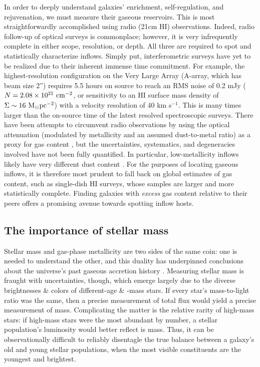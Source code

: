 In order to deeply understand galaxies' enrichment, self-regulation, and rejuvenation, we must measure their gaseous reservoirs. This is most straightforwardly accomplished using radio (21cm HI) observations. Indeed, radio follow-up of optical surveys is commonplace; however, it is very infrequently complete in either scope, resolution, or depth. All three are required to spot and statistically characterize inflows. Simply put, interferometric surveys have yet to be realized due to their inherent immense time commitment. For example, the highest-resolution configuration on the Very Large Array (A-array, which has beam size 2'') requires 5.5 hours on source to reach an RMS noise of 0.2 mJy ($N = 2.08 \times 10^{21} ~ {\rm cm^{-2}}$, or sensitivity to an HI surface mass density of $\Sigma \sim  16 ~ {\rm M_{\odot} pc^{-2}}$) with a velocity resolution of 40 km s$^{-1}$. This is many times larger than the on-source time of the latest resolved spectroscopic surveys. There have been attempts to circumvent radio observations by using the optical attenuation (modulated by metallicity and an assumed dust-to-metal ratio) as a proxy for gas content \citep{brinchmann_13,carton_brinchmann_2017, barrera-ballesteros_20_edge-califa}, but the uncertainties, systematics, and degeneracies involved have not been fully quantified. In particular, low-metallicity inflows likely have very different dust content \citep{kahre_walterbos_2018_legus_dusttogas}. For the purposes of locating gaseous inflows, it is therefore most prudent to fall back on global estimates of gas content, such as single-dish HI surveys, whose samples are larger and more statistically complete. Finding galaxies with \textit{excess} gas content relative to their peers offers a promising avenue towards spotting inflow hosts.

\subsection{The importance of stellar mass}

Stellar mass and gas-phase metallicity are two sides of the same coin: one is needed to understand the other, and this duality has underpinned conclusions about the universe's past gaseous accretion history \citep{erb_06_mzr-z2}. Measuring stellar mass is fraught with uncertainties, though, which emerge largely due to the diverse brightnesses \& colors of different-age \& -mass stars. If every star's mass-to-light ratio was the same, then a precise measurement of total flux would yield a precise measurement of mass. Complicating the matter is the relative rarity of high-mass stars: if high-mass stars were the most abundant by number, a stellar population's luminosity would better reflect is mass. Thus, it can be observationally difficult to reliably disentagle the true balance between a galaxy's old and young stellar populations, when the most visible constituents are the youngest and brightest. 

